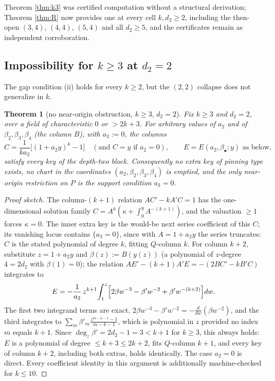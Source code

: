 \documentclass[11pt]{article}
\newtheorem{theorem}{Theorem}[section]
\theoremstyle{definition}
\theoremstyle{remark}
\begin{document}
Theorem \ref{thm:k3} was certified computation without a structural derivation; Theorem \ref{thm:R} now provides one at every cell $k,d_2\geq2$, including the then-open $(3,4)$, $(4,4)$, $(5,4)$ and all $d_2\geq5$, and the certificates remain as independent corroboration.

\subsection{Impossibility for $k\geq 3$ at $d_2=2$}

The gap condition (ii) holds for every $k\geq2$, but the $(2,2)$ collapse does not generalize in $k$.

\begin{theorem}[no near-origin obstruction, $k\geq3$, $d_2=2$]\label{thm:kbig}
Fix $k\geq3$ and $d_2=2$, over a field of characteristic $0$ or $>2k+3$. For arbitrary values of $a_2$ and of $\beta_2,\beta_3,\beta_4$ (the column $B$), with $a_3:=0$, the columns
\[
C=\frac{1}{ka_2}\bigl[(1+a_2y)^k-1\bigr]
\quad(\text{and } C=y \text{ if } a_2=0),
\qquad
E=E(a_2,\beta_\bullet;y) \text{ as below},
\]
satisfy every key of the depth-two block. Consequently no extra key of pinning type exists, no chart in the coordinates $(a_2,\beta_2,\beta_3,\beta_4)$ is emptied, and the only near-origin restriction on $P$ is the support condition $a_3=0$.
\end{theorem}

\begin{proof}[Proof sketch]
The column-$(k{+}1)$ relation $AC'-kA'C=1$ has the one-dimensional solution family $C=A^k(\kappa+\int_0^yA^{-(k+1)})$, and the valuation $\geq1$ forces $\kappa=0$. The inner extra key is the would-be next series coefficient of this $C$; its vanishing locus contains $\{a_3=0\}$, since with $A=1+a_2y$ the series truncates: $C$ is the stated polynomial of degree $k$, fitting $Q$-column $k$. For column $k+2$, substitute $z=1+a_2y$ and $\beta(z):=B(y(z))$ (a polynomial of $z$-degree $4=2d_2$ with $\beta(1)=0$); the relation $AE'-(k+1)A'E=-(2BC'-kB'C)$ integrates to
\[
E=-\frac{1}{a_2}\,z^{k+1}\!\int_1^z\Bigl[2\beta w^{-3}-\beta'w^{-2}+\beta'w^{-(k+2)}\Bigr]dw .
\]
The first two integrand terms are exact, $2\beta w^{-3}-\beta'w^{-2}=-\frac{d}{dw}(\beta w^{-2})$, and the third integrates to $\sum_m \beta'_m\frac{z^{m-k-1}-1}{m-k-1}$, which is polynomial in $z$ provided no index $m$ equals $k+1$. Since $\deg_z\beta'=2d_2-1=3<k+1$ for $k\geq3$, this always holds: $E$ is a polynomial of degree $\leq k+3\leq 2k+2$, fits $Q$-column $k+1$, and every key of column $k+2$, including both extras, holds identically. The case $a_2=0$ is direct. Every coefficient identity in this argument is additionally machine-checked for $k\leq10$.
\end{proof}
\end{document}
